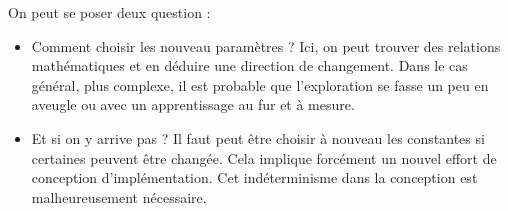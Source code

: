 On peut se poser deux question :
\begin{itemize}
\item Comment choisir les nouveau paramètres ? Ici, on peut trouver des relations mathématiques et en déduire une direction de changement. Dans le cas général, plus complexe, il est probable que l'exploration se fasse un peu en aveugle ou avec un apprentissage au fur et à mesure.
\item Et si on y arrive pas ? Il faut peut être choisir à nouveau les constantes si certaines peuvent être changée. Cela implique forcément un nouvel effort de conception d'implémentation. Cet indéterminisme dans la conception est malheureusement nécessaire.
\end{itemize}

